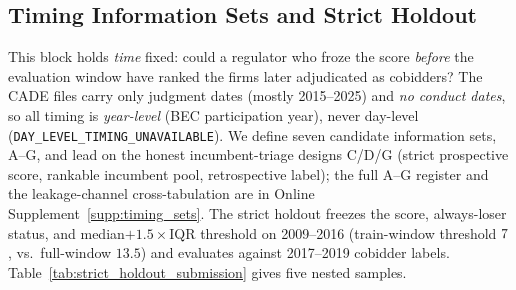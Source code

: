 \subsection{Timing Information Sets and Strict Holdout}
\label{app:strict_holdout_submission}
\label{app:timing_sets_submission}

This block holds \emph{time} fixed: could a regulator who froze the
score \emph{before} the evaluation window have ranked the firms later
adjudicated as cobidders? The CADE files carry only judgment dates
(mostly 2015--2025) and \emph{no conduct dates}, so all timing is
\emph{year-level} (BEC participation year), never day-level
(\texttt{DAY\_LEVEL\_TIMING\_UNAVAILABLE}). We define seven candidate
information sets, A--G, and lead on the honest incumbent-triage designs
C/D/G (strict prospective score, rankable incumbent pool, retrospective
label); the full A--G register and the leakage-channel cross-tabulation
are in Online Supplement~\ref{supp:timing_sets}. The strict holdout
freezes the score, always-loser status, and median$+1.5\times$IQR
threshold on 2009--2016 (train-window threshold $7$,
vs.\ full-window $13.5$) and evaluates against 2017--2019 cobidder
labels. Table~\ref{tab:strict_holdout_submission} gives five nested
samples.

